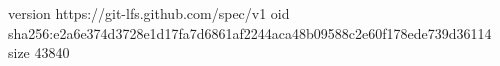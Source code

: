 version https://git-lfs.github.com/spec/v1
oid sha256:e2a6e374d3728e1d17fa7d6861af2244aca48b09588c2e60f178ede739d36114
size 43840
